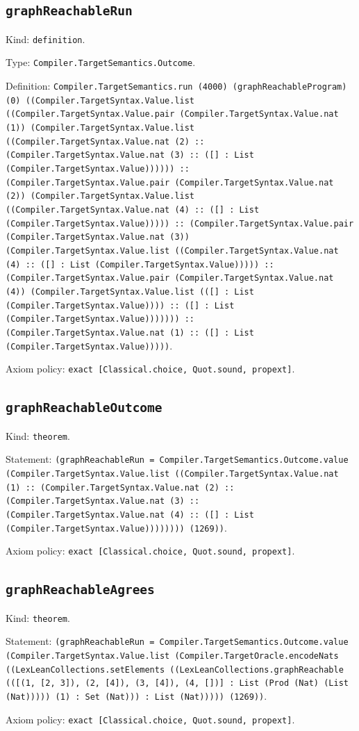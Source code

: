 \documentclass[11pt]{article}
\begin{document}
\subsection*{\texttt{graphReachableRun}}
\noindent Kind: \texttt{definition}.\par
\noindent Type: \texttt{Compiler.TargetSemantics.Outcome}.\par
\noindent Definition: \texttt{Compiler.TargetSemantics.run (4000) (graphReachableProgram) (0) ((Compiler.TargetSyntax.Value.list ((Compiler.TargetSyntax.Value.pair (Compiler.TargetSyntax.Value.nat (1)) (Compiler.TargetSyntax.Value.list ((Compiler.TargetSyntax.Value.nat (2) :: (Compiler.TargetSyntax.Value.nat (3) :: ([] : List (Compiler.TargetSyntax.Value)))))) :: (Compiler.TargetSyntax.Value.pair (Compiler.TargetSyntax.Value.nat (2)) (Compiler.TargetSyntax.Value.list ((Compiler.TargetSyntax.Value.nat (4) :: ([] : List (Compiler.TargetSyntax.Value))))) :: (Compiler.TargetSyntax.Value.pair (Compiler.TargetSyntax.Value.nat (3)) (Compiler.TargetSyntax.Value.list ((Compiler.TargetSyntax.Value.nat (4) :: ([] : List (Compiler.TargetSyntax.Value))))) :: (Compiler.TargetSyntax.Value.pair (Compiler.TargetSyntax.Value.nat (4)) (Compiler.TargetSyntax.Value.list (([] : List (Compiler.TargetSyntax.Value)))) :: ([] : List (Compiler.TargetSyntax.Value))))))) :: (Compiler.TargetSyntax.Value.nat (1) :: ([] : List (Compiler.TargetSyntax.Value)))))}.\par
\noindent Axiom policy: \texttt{exact [Classical.choice, Quot.sound, propext]}.\par
\subsection*{\texttt{graphReachableOutcome}}
\noindent Kind: \texttt{theorem}.\par
\noindent Statement: \texttt{(graphReachableRun = Compiler.TargetSemantics.Outcome.value (Compiler.TargetSyntax.Value.list ((Compiler.TargetSyntax.Value.nat (1) :: (Compiler.TargetSyntax.Value.nat (2) :: (Compiler.TargetSyntax.Value.nat (3) :: (Compiler.TargetSyntax.Value.nat (4) :: ([] : List (Compiler.TargetSyntax.Value)))))))) (1269))}.\par
\noindent Axiom policy: \texttt{exact [Classical.choice, Quot.sound, propext]}.\par
\subsection*{\texttt{graphReachableAgrees}}
\noindent Kind: \texttt{theorem}.\par
\noindent Statement: \texttt{(graphReachableRun = Compiler.TargetSemantics.Outcome.value (Compiler.TargetSyntax.Value.list (Compiler.TargetOracle.encodeNats ((LexLeanCollections.setElements ((LexLeanCollections.graphReachable (([(1, [2, 3]), (2, [4]), (3, [4]), (4, [])] : List (Prod (Nat) (List (Nat))))) (1) : Set (Nat))) : List (Nat))))) (1269))}.\par
\noindent Axiom policy: \texttt{exact [Classical.choice, Quot.sound, propext]}.\par
\end{document}
